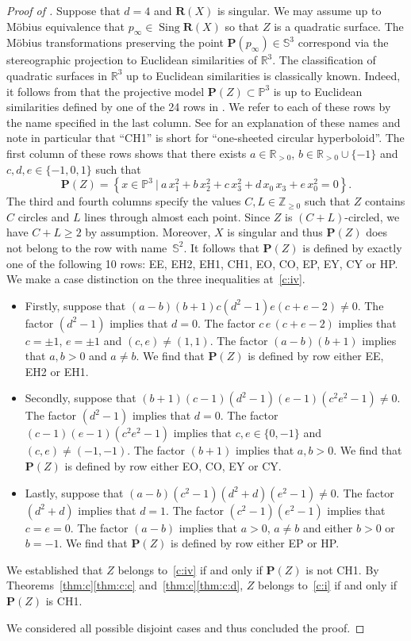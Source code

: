 \documentclass[11pt]{article}
\newenvironment{Mlist}{\begin{itemize}[topsep=0pt,itemsep=4pt,leftmargin=7mm]}{\end{itemize}}
\newcommand{\R}{\mathbb{R}}
\renewcommand{\P}{\mathbb{P}}
\renewcommand{\S}{\mathbb{S}}
\newcommand{\Z}{\mathbb{Z}}
\newcommand{\bP}{\mathbf{P}}
\newcommand{\bR}{\mathbf{R}}
\newcommand{\set}[2]{\left\{#1 ~|~ #2\right\}}
\newcommand{\Sing}{\operatorname{Sing}}
\newcommand{\st}{such that }
\begin{document}
\begin{proof}[Proof of ]
Suppose that $d=4$ and $\bR(X)$ is singular.
We may assume up to M\"obius equivalence that $p_\infty\in \Sing \bR(X)$ so that $Z$ is a quadratic surface.
The M\"obius transformations preserving the point $\bP(p_\infty)\in\S^3$
correspond via the stereographic projection to Euclidean similarities of $\R^3$.
The classification of quadratic surfaces in $\R^3$ up to Euclidean similarities is classically known.
Indeed, it follows from \citep[Proposition~4]{2021circ} that
the projective model $\bP(Z)\subset\P^3$ is up to Euclidean similarities defined
by one of the 24 rows in \citep[Table~11]{2021circ}.
We refer to each of these rows by the name specified in the last column.
See \citep[Definition~3]{2021circ} for an explanation of these names
and note in particular that ``CH1'' is short for ``one-sheeted circular hyperboloid''.
The first column of these rows shows
that there exists $a\in\R_{>0}$, $b\in\R_{>0}\cup\{-1\}$ and $c,d,e\in\{-1,0,1\}$ \st
\[
\bP(Z)=\set{x\in\P^3}{a\,x_1^2+b\,x_2^2+c\,x_3^2+d\,x_0\,x_3+e\,x_0^2=0}.
\]
The third and fourth columns specify the values $C,L\in\Z_{\geq 0}$
\st $Z$ contains $C$ circles and $L$ lines through almost each point.
Since $Z$ is $(C+L)$-circled, we have $C+L\geq 2$ by assumption.
Moreover, $X$ is singular and thus $\bP(Z)$ does not belong to the row with name~$\S^2$.
It follows that $\bP(Z)$ is defined by exactly one of the following 10 rows:
EE, EH2, EH1, CH1, EO, CO, EP, EY, CY or HP.
We make a case distinction on the three inequalities at~\ref{c:iv}.
\begin{Mlist}
\item Firstly, suppose that $(a-b)(b+1)c(d^2-1)e(c+e-2)\neq 0$.
The factor $(d^2-1)$ implies that $d=0$.
The factor $c\,e\,(c+e-2)$ implies that $c=\pm 1$, $e=\pm 1$ and $(c,e)\neq (1,1)$.
The factor $(a-b)(b+1)$ implies that $a,b>0$ and $a\neq b$.
We find that $\bP(Z)$ is defined by row either EE, EH2 or EH1.

\item Secondly, suppose that $(b+1)(c-1)(d^2-1)(e-1)(c^2e^2-1)\neq 0$.
The factor $(d^2-1)$ implies that $d=0$.
The factor $(c-1)(e-1)(c^2e^2-1)$ implies that $c,e\in\{0,-1\}$ and $(c,e)\neq(-1,-1)$.
The factor $(b+1)$ implies that $a,b>0$.
We find that $\bP(Z)$ is defined by row either EO, CO, EY or CY.

\item Lastly, suppose that
$(a-b)(c^2-1)(d^2+d)(e^2-1)\neq 0$.
The factor $(d^2+d)$ implies that $d=1$.
The factor $(c^2-1)(e^2-1)$ implies that $c=e=0$.
The factor $(a-b)$ implies that $a>0$, $a\neq b$ and either $b>0$ or $b=-1$.
We find that $\bP(Z)$ is defined by row either EP or HP.
\end{Mlist}
We established that $Z$ belongs to~\ref{c:iv}
if and only if $\bP(Z)$ is not CH1.
By Theorems~\ref{thm:c}\ref{thm:c:c} and~\ref{thm:c}\ref{thm:c:d},
$Z$ belongs to~\ref{c:i} if and only if $\bP(Z)$ is CH1.

We considered all possible disjoint cases and thus concluded the proof.
\end{proof}
\end{document}
